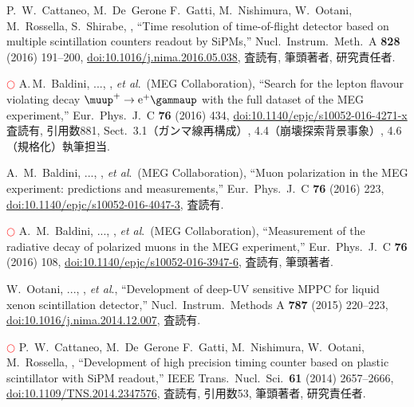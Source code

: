 \begin{enumerate}
  P.~W.~Cattaneo, M.~De~Gerone F.~Gatti, M.~Nishimura, W.~Ootani, M.~Rossella, S.~Shirabe, \me, 
  ``Time resolution of time-of-flight detector based on multiple scintillation counters readout by SiPMs,''
  Nucl.\ Instrum.\ Meth.\ A {\bf 828} (2016) 191--200,
  \href{http://dx.doi.org/10.1016/j.nima.2016.05.038}{doi:10.1016/j.nima.2016.05.038},
  査読有, 筆頭著者, 研究責任者.

\textcolor{red}{$\bigcirc$} 
  A.\,M.~Baldini, ..., \me, {\it et al}.\ (MEG Collaboration),
  ``Search for the lepton flavour violating decay $\megc$ with the full dataset of the MEG experiment,''
  Eur.\ Phys.\ J.\ C {\bf 76} (2016) 434,
  \href{https://doi.org/10.1140/epjc/s10052-016-4271-x}{doi:10.1140/epjc/s10052-016-4271-x}
  査読有, 引用数881, Sect.\ 3.1（ガンマ線再構成）, 4.4（崩壊探索背景事象）, 4.6（規格化）執筆担当.

  A.~M.~Baldini, ..., \me, {\it et al}.\ (MEG Collaboration),
  ``Muon polarization in the MEG experiment: predictions and measurements,''
  Eur.\ Phys.\ J.\ C {\bf 76} (2016) 223,
  \href{http://dx.doi.org/10.1140/epjc/s10052-016-4047-3}{doi:10.1140/epjc/s10052-016-4047-3}, 査読有.

\textcolor{red}{$\bigcirc$}
  A.~M.~Baldini, ..., \me, {\it et al}.\ (MEG Collaboration),
  ``Measurement of the radiative decay of polarized muons in the MEG experiment,''
  Eur.\ Phys.\ J.\ C {\bf 76} (2016) 108,
  \href{https://doi.org/10.1140/epjc/s10052-016-3947-6}{doi:10.1140/epjc/s10052-016-3947-6},
査読有, 筆頭著者.

  W.~Ootani, ..., \me,  {\it et al}., %
  ``Development of deep-UV sensitive MPPC for liquid xenon scintillation detector,''
  Nucl.\ Instrum.\ Methods A {\bf 787} (2015) 220--223,
  \href{https://doi.org/10.1016/j.nima.2014.12.007}{doi:10.1016/j.nima.2014.12.007},
  査読有.

  \textcolor{red}{$\bigcirc$} 
  P.~W.~Cattaneo, M.~De~Gerone F.~Gatti, M.~Nishimura, W.~Ootani, M.~Rossella, \me, 
  ``Development of high precision timing counter based on plastic scintillator with SiPM readout,''
  IEEE Trans.\ Nucl.\ Sci.\ {\bf 61} (2014) 2657--2666,
  \href{http://dx.doi.org/10.1109/TNS.2014.2347576}{doi:10.1109/TNS.2014.2347576},
  査読有, 引用数53, 筆頭著者, 研究責任者.


\end{enumerate}
